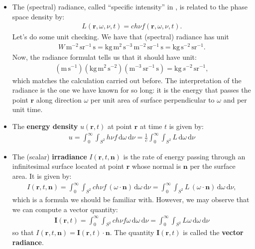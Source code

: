 \documentclass[10pt]{article}
\newcommand{\dee}{\mathrm{d}}
\newcommand{\ve}[1]{\mathbf{#1}}
\newcommand{\metre}{\mathrm{m}}
\newcommand{\second}{\mathrm{s}}
\newcommand{\sterad}{\mathrm{sr}}
\newcommand{\kg}{\mathrm{kg}}
\begin{document}
\begin{itemize}
    \item The (spectral) radiance, called ``specific intensity'' in \cite{pomraning}, is related to the phase space density by:
    \begin{align*}
      L(\ve{r}, \omega, \nu, t) = c h \nu f(\ve{r}, \omega, \nu, t).
    \end{align*}
    Let's do some unit checking. We have that (spectral) radiance has unit 
    \begin{align*}
      W\, \mathrm{m}^{-2}\,\mathrm{sr}^{-1}\,\second = \mathrm{kg}\, \mathrm{m}^2\, \mathrm{s}^{-3}\, \mathrm{m}^{-2}\,\mathrm{sr}^{-1}\, \second = \mathrm{kg}\,\mathrm{s}^{-2}\,\mathrm{sr}^{-1}.
    \end{align*}
    Now, the radiance formulat tells us that it should have unit:
    \begin{align*}
      (\metre\,\second^{-1}) (\kg\, \metre^2\, \second^{-2})(\metre^{-3}\, \sterad^{-1}\, \second) = \kg\,s^{-2}\,\sterad^{-1},
    \end{align*}    
    which matches the calculation carried out before. The interpretation of the radiance is the one we have known for so long: it is the energy that passes the point $\ve{r}$ along direction $\omega$ per unit area of surface perpendicular to $\omega$ and per unit time.

    \item The \textbf{energy density} $u(\ve{r},t)$ at point $\ve{r}$ at time $t$ is given by:
    \begin{align*}
      u = \int_{0}^\infty \int_{S^2} h \nu f\, \dee \omega\, \dee \nu = \frac{1}{c} \int_{0}^\infty \int_{S^2} L \, \dee \omega\, \dee \nu
    \end{align*}

    \item The (scalar) \textbf{irradiance} $I(\ve{r}, t, \ve{n})$ is the rate of energy passing through an infinitesimal surface located at point $\ve{r}$ whose normal is $\ve{n}$ per the surface area. It is given by:
    \begin{align*}
      I(\ve{r}, t, \ve{n}) = \int_{0}^\infty \int_{S^2} c h \nu f\,  (\omega \cdot \ve{n}) \, \dee \omega\, \dee \nu = \int_{0}^\infty \int_{S^2} L \,  (\omega \cdot \ve{n}) \, \dee \omega\, \dee \nu,
    \end{align*}
    which is a formula we should be familiar with. However, we may observe that we can compute a vector quantity:
    \begin{align*}
      \ve{I}(\ve{r},t) = \int_{0}^\infty \int_{S^2} c h \nu f \omega\, \dee \omega\, \dee \nu = \int_{0}^\infty \int_{S^2} L \omega\, \dee \omega\, \dee \nu
    \end{align*}
    so that $I(\ve{r}, t, \ve{n}) = \ve{I}(\ve{r},t) \cdot \ve{n}.$ The quantity $\ve{I}(\ve{r},t)$ is called the \textbf{vector radiance}.


\end{itemize}
\end{document}
